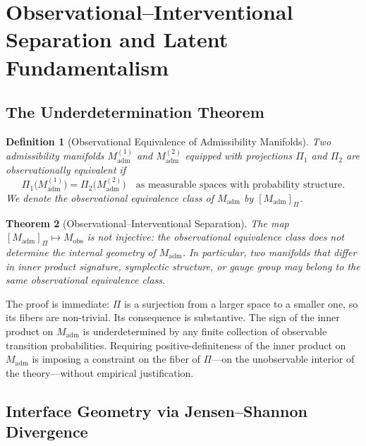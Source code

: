 \documentclass[12pt,a4paper]{article}
\newtheorem{theorem}{Theorem}[section]
\newtheorem{definition}[theorem]{Definition}
\theoremstyle{remark}
\begin{document}
\section{Observational--Interventional Separation and Latent Fundamentalism}

\subsection{The Underdetermination Theorem}

\begin{definition}[Observational Equivalence of Admissibility Manifolds]
Two admissibility manifolds $M_{\mathrm{adm}}^{(1)}$ and $M_{\mathrm{adm}}^{(2)}$
equipped with projections $\Pi_1$ and $\Pi_2$ are \emph{observationally
equivalent} if
\begin{equation}
  \Pi_1\!\bigl(M_{\mathrm{adm}}^{(1)}\bigr)
  = \Pi_2\!\bigl(M_{\mathrm{adm}}^{(2)}\bigr)
  \quad \text{as measurable spaces with probability structure.}
\end{equation}
We denote the observational equivalence class of $M_{\mathrm{adm}}$ by
$[M_{\mathrm{adm}}]_\Pi$.
\end{definition}

\begin{theorem}[Observational--Interventional Separation]
The map $[M_{\mathrm{adm}}]_\Pi \mapsto M_{\mathrm{obs}}$ is not injective:
the observational equivalence class does not determine the internal geometry
of $M_{\mathrm{adm}}$. In particular, two manifolds that differ in inner
product signature, symplectic structure, or gauge group may belong to the
same observational equivalence class.
\end{theorem}

The proof is immediate: $\Pi$ is a surjection from a larger space to a
smaller one, so its fibers are non-trivial. Its consequence is substantive. The sign of the inner product
on $M_{\mathrm{adm}}$ is underdetermined by any finite collection of
observable transition probabilities. Requiring positive-definiteness of
the inner product on $M_{\mathrm{adm}}$ is imposing a constraint on the
fiber of $\Pi$---on the unobservable interior of the theory---without
empirical justification.

\subsection{Interface Geometry via Jensen--Shannon Divergence}
\end{document}
